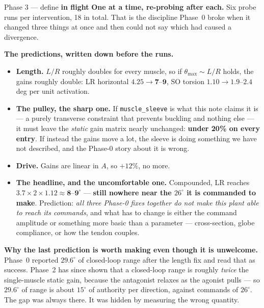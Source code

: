 \documentclass[11pt,a4paper]{article}
\newcommand{\code}[1]{\texttt{#1}}
\newcommand{\fl}{\textcolor{warn}{\textbf{in flight}}}
\begin{document}
\begin{phasebox}{Phase 3 --- define \hfill \fl}
\textbf{One at a time, re-probing after each.} Six probe runs per intervention, 18 in total.
That is the discipline Phase~0 broke when it changed three things at once and then could not say
which had caused a divergence.

\begin{tcolorbox}[colback=rule!5,colframe=rule!45,boxrule=0.7pt,arc=2pt]
\textbf{The predictions, written down before the runs.}
\begin{itemize}
\item \textbf{Length.} $L/R$ roughly doubles for every muscle, so if $\theta_{\max}\sim L/R$ holds,
the gains roughly double: LR horizontal $4.25 \to \mathbf{7}$--$\mathbf{9}$, SO torsion
$1.10 \to \mathbf{1.9}$--$\mathbf{2.4}$ deg per unit activation.
\item \textbf{The pulley, the sharp one.} If \code{muscle\_sleeve} is what this note claims it is
--- a purely transverse constraint that prevents buckling and nothing else --- it must leave the
\emph{static} gain matrix nearly unchanged: \textbf{under 20\% on every entry}. If instead the gains
move a lot, the sleeve is doing something we have not described, and the Phase-0 story about it is
wrong.
\item \textbf{Drive.} Gains are linear in $A$, so $+12\%$, no more.
\item \textbf{The headline, and the uncomfortable one.} Compounded, LR reaches
$3.7 \times 2 \times 1.12 \approx \mathbf{8}$--$\mathbf{9^\circ}$ --- \textbf{still nowhere near the
$26^\circ$ it is commanded to make}. Prediction: \emph{all three Phase-0 fixes together do not make
this plant able to reach its commands}, and what has to change is either the command amplitude or
something more basic than a parameter --- cross-section, globe compliance, or how the tendon
couples.
\end{itemize}
\end{tcolorbox}

\textbf{Why the last prediction is worth making even though it is unwelcome.} Phase~0 reported
$29.6^\circ$ of closed-loop range after the length fix and read that as success. Phase~2 has since
shown that a closed-loop range is roughly \emph{twice} the single-muscle static gain, because the
antagonist relaxes as the agonist pulls --- so $29.6^\circ$ of range is about $15^\circ$ of
authority per direction, against commands of $26^\circ$. The gap was always there. It was hidden by
measuring the wrong quantity.
\end{phasebox}
\end{document}
